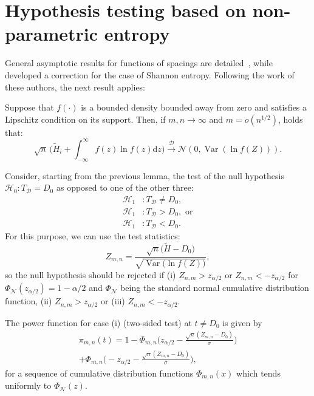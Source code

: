 \documentclass[conference,final,]{IEEEtran}
\begin{document}
\hypertarget{sec:test}{%
\section{Hypothesis testing based on non-parametric
entropy}\label{sec:test}}

General asymptotic results for functions of spacings are
detailed~\cite{Khashimov1990}, while~\cite{Bert1992} developed a
correction for the case of Shannon entropy. Following the work of these
authors, the next result applies:

\begin{lemma}
Suppose that $f(\cdot)$ is a bounded density bounded away from zero and satisfies a Lipschitz condition on its support.
Then, if $m,n\rightarrow \infty$ and $m=o(n^{1/2})$, holds that:
\begin{equation*}
\sqrt{n}\,\Big(\label{Eq:bias_t}
\widetilde{H}_{i}+\int_{-\infty}^\infty f(z)\ln f(z) \mathrm{d}z\Big)
\xrightarrow[]{\mathcal{D}}
\mathcal{N}(0,\operatorname{Var}(\ln f(Z))).
\end{equation*}
\end{lemma}

Consider, starting from the previous lemma, the test of the null
hypothesis \(\mathcal{H}_0: T_{\mathcal{D}}=D_0\) as opposed to one of
the other three: \begin{align*}
\mathcal{H}_1 &: T_{\mathcal{D}}\neq D_0,\\ 
\mathcal{H}_1 &: T_{\mathcal{D}}> D_0,\text{ or}\\
\mathcal{H}_1 &: T_{\mathcal{D}}< D_0. 
\end{align*} For this purpose, we can use the test statistics:
\begin{equation*}
Z_{m,n} = \frac{\sqrt{n}\big(\label{Eq:bias4}
\widetilde{H}-D_0\big)}{\sqrt{\operatorname{Var}\big(\ln f(Z)\big)}},
\end{equation*} so the null hypothesis should be rejected if (i)
\(Z_{n,m} > z_{\alpha/2}\) or \(Z_{n,m} < - z_{\alpha/2}\) for
\(\Phi_{\mathcal N}(z_{\alpha/2})=1-\alpha/2\) and \(\Phi_{\mathcal N}\)
being the standard normal cumulative distribution function, (ii)
\(Z_{n,m} > z_{\alpha/2}\) or (iii) \(Z_{n,m} < - z_{\alpha/2}\).

The power function for case (i) (two-sided test) at \(t\neq D_0\) is
given by \begin{multline*}
\pi_{m,n}(t)=1-\Phi_{m,n}\Big(z_{\alpha/2}-\frac{\sqrt{n}(Z_{m,n}-D_0)}{\sigma}\Big)\\+\Phi_{m,n}\Big(-z_{\alpha/2}-\frac{\sqrt{n}(Z_{m,n}-D_0)}{\sigma}\Big),
\end{multline*} for a sequence of cumulative distribution functions
\(\Phi_{m,n}(x)\) which tends uniformly to \(\Phi_{\mathcal N}(z)\).
\end{document}
